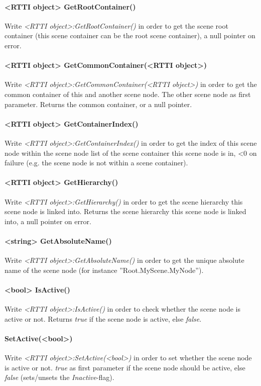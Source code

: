 \paragraph{<RTTI object> GetRootContainer()}
Write \emph{<RTTI object>:GetRootContainer()} in order to get the scene root container (this scene container can be the root scene container), a null pointer on error.

\paragraph{<RTTI object> GetCommonContainer(<RTTI object>)}
Write \emph{<RTTI object>:GetCommonContainer(<RTTI object>)} in order to get the common container of this and another scene node. The other scene node as first parameter. Returns the common container, or a null pointer.

\paragraph{<RTTI object> GetContainerIndex()}
Write \emph{<RTTI object>:GetContainerIndex()} in order to get the index of this scene node within the scene node list of the scene container this scene node is in, <0 on failure (e.g. the scene node is not within a scene container).

\paragraph{<RTTI object> GetHierarchy()}
Write \emph{<RTTI object>:GetHierarchy()} in order to get the scene hierarchy this scene node is linked into. Returns the scene hierarchy this scene node is linked into, a null pointer on error.

\paragraph{<string> GetAbsoluteName()}
Write \emph{<RTTI object>:GetAbsoluteName()} in order to get the unique absolute name of the scene node (for instance ''Root.MyScene.MyNode'').

\paragraph{<bool> IsActive()}
Write \emph{<RTTI object>:IsActive()} in order to check whether the scene node is active or not. Returns \emph{true} if the scene node is active, else \emph{false}.

\paragraph{SetActive(<bool>)}
Write \emph{<RTTI object>:SetActive(<bool>)} in order to set whether the scene node is active or not. \emph{true} as first parameter if the scene node should be active, else \emph{false} (sets/unsets the \emph{Inactive}-flag).

